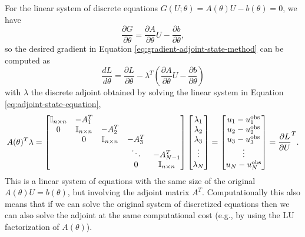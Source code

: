 For the linear system of discrete equations $G(U; \theta)=A(\theta) U - b(\theta)=0$, we have 
\begin{equation}
    \frac{\partial G}{\partial \theta} 
    = 
    \frac{\partial A }{\partial \theta} U - \frac{\partial b}{\partial \theta},
\end{equation}
so the desired gradient in Equation \eqref{eq:gradient-adjoint-state-method} can be computed as 
\begin{equation}
    \frac{dL}{d\theta} 
    = 
    \frac{\partial L}{\partial \theta} 
    - 
    \lambda^T \left( \frac{\partial A }{\partial \theta} U - \frac{\partial b}{\partial \theta} \right)
    \label{eq:dhdtheta_linear}
\end{equation}
with $\lambda$ the discrete adjoint obtained by solving the linear system in Equation \eqref{eq:adjoint-state-equation},
\begin{equation}
    A(\theta)^T \lambda 
    =
    \begin{bmatrix}
        \operatorname{\mathbb{I}}_{n \times n} & -A_1^T &   &  & \\
        0 & \operatorname{\mathbb{I}}_{n \times n} & -A_2^T &  &  \\
          & 0 & \operatorname{\mathbb{I}}_{n \times n} & -A_3^T &  \\
         &  &   & \ddots & -A_{N-1}^T  \\
         &  &  & 0 & \operatorname{\mathbb{I}}_{n \times n}
    \end{bmatrix}
    \begin{bmatrix}
        \lambda_1 \\
        \lambda_2 \\
        \lambda_3 \\
        \vdots \\
        \lambda_N
    \end{bmatrix}
    = 
    \begin{bmatrix}
        u_1 - u_1^\text{obs} \\
        u_2 - u_2^\text{obs} \\
        u_3 - u_3^\text{obs} \\
        \vdots \\
        u_N - u_N^\text{obs}     
    \end{bmatrix}
    = 
    \frac{\partial L}{\partial U}^T.
    \label{eq:linea-adjoint-state-equation}
\end{equation}
This is a linear system of equations with the same size of the original $A(\theta) U = b(\theta)$, but involving the adjoint matrix $A^T$. 
Computationally this also means that if we can solve the original system of discretized equations then we can also solve the adjoint at the same computational cost (e.g., by using the LU factorization of $A(\theta)$). 

